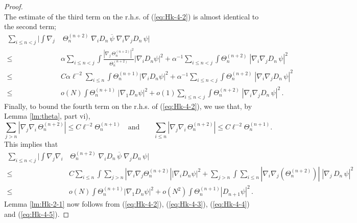 \documentclass[11pt]{article}
\renewcommand{\a}{\alpha}
\begin{document}
\begin{proof}
\begin{equation}
\end{equation}
The estimate of the third term on the r.h.s. of (\ref{eq:Hk-4-2}) is
almost identical to the second term;
\begin{equation}\label{eq:Hk-4-4}
\begin{split}
\sum_{i\leq n < j} \Big|\int \nabla_j &\; \Theta^{(n+2)}_n \;
\nabla_i D_n \, \overline{\psi} \; \nabla_i \nabla_j D_n \, \psi
\Big| \\ \leq \; & \a\sum_{i\leq n < j}  \int \frac{|\nabla_j \,
\Theta^{(n+2)}_n|^2}{\Theta^{(n+2)}_n}  |\nabla_i D_n \psi|^2
+\a^{-1} \sum_{i\leq n < j} \int \Theta^{(n+2)}_n \; |\nabla_i
\nabla_j D_n \, \psi|^2
\\ \leq \; &C \a \ell^{-2} \sum_{i \leq n} \int
\Theta^{(n+1)}_{n} |\nabla_i D_n \psi|^2 + \a^{-1} \sum_{i\leq n <
j}\int \Theta^{(n+2)}_n \; |\nabla_i \nabla_j D_n \, \psi|^2 \\ \leq
\; & o(N) \int \Theta^{(n+1)}_n \; |\nabla_1 D_n \psi|^2 + o(1)
\sum_{i \leq n < j}\int \Theta^{(n+2)}_n \; |\nabla_i \nabla_j D_n
\, \psi|^2\,.
\end{split}
\end{equation}
Finally, to bound the fourth term on the r.h.s. of
(\ref{eq:Hk-4-2}), we use that, by Lemma \ref{lm:theta}, part vi),
\begin{equation}
\sum_{j >n} |\nabla_j \nabla_i \, \Theta^{(n+2)}_n| \leq C \ell^{-2}
\Theta^{(n+1)}_n \quad \text{and} \qquad \sum_{i \leq n} |\nabla_j
\nabla_i \, \Theta^{(n+2)}_n| \leq C \ell^{-2} \Theta^{(n+1)}_n .
\end{equation}
This implies that
\begin{equation}\label{eq:Hk-4-5}
\begin{split}
\sum_{i\leq n < j} \Big|\int \nabla_j \nabla_i &\, \Theta^{(n+2)}_n
\; \nabla_i D_n \, \overline{\psi} \; \nabla_j D_n \, \psi \Big|
\\ \leq \; & C \sum_{i \leq n} \int \sum_{j >n} | \nabla_i \nabla_j
\Theta^{(n+2)}_n|  |\nabla_i D_n \psi|^2 + \sum_{j >n} \int \sum_{i
\leq n} |\nabla_i \nabla_j
(\Theta^{(n+2)}_n)| \; |\nabla_j \, D_n \, \psi|^2 \\
\leq \; &o(N) \int  \Theta^{(n+1)}_{n} |\nabla_1 D_n \psi|^2 +
o(N^2) \int \Theta^{(n+1)}_n |D_{n+1} \psi|^2 \,.
\end{split}
\end{equation}
Lemma \ref{lm:Hk-2-1} now follows from (\ref{eq:Hk-4-2}),
(\ref{eq:Hk-4-3}), (\ref{eq:Hk-4-4}) and (\ref{eq:Hk-4-5}).
\end{proof}
\end{document}
